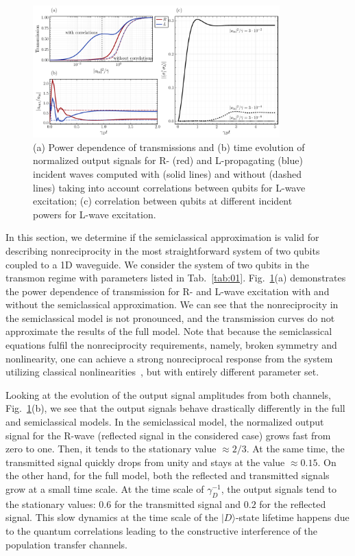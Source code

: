 \documentclass[lettersize,journal]{IEEEtran}
\begin{document}
\begin{figure}[t]
    \centering
    \includegraphics[width=0.85\textwidth]{fig_6}
    \caption{(a) Power dependence of transmissions and (b) time evolution of normalized output signals for R- (red) and L-propagating (blue) incident waves computed with (solid lines) and without (dashed lines) taking into account correlations between qubits for L-wave excitation; (c) correlation between qubits at different incident powers for L-wave excitation.}
    \label{fig:07}
\end{figure}
In this section, we determine if the semiclassical approximation is valid for describing nonreciprocity in the most straightforward system of two qubits coupled to a 1D waveguide.
We consider the system of two qubits in the transmon regime with parameters listed in Tab.~\ref{tab:01}.
Fig.~\ref{fig:07}(a) demonstrates the power dependence of transmission for R- and L-wave excitation with and without the semiclassical approximation.
We can see that the nonreciprocity in the semiclassical model is not pronounced, and the transmission curves do not approximate the results of the full model.
Note that because the semiclassical equations fulfil the nonreciprocity requirements, namely, broken symmetry and nonlinearity, one can achieve a strong nonreciprocal response from the system utilizing classical nonlinearities~\cite{cotrufo2021nonlinearity1, cotrufo2021nonlinearity2, sounas_fundamental_2018, yang_inverse-designed_2020}, but with entirely different parameter set.

Looking at the evolution of the output signal amplitudes from both channels, Fig.~\ref{fig:07}(b), we see that the output signals behave drastically differently in the full and semiclassical models.
In the semiclassical model, the normalized output signal for the R-wave (reflected signal in the considered case) grows fast from zero to one. 
Then, it tends to the stationary value $\approx 2/3$.
At the same time, the transmitted signal quickly drops from unity and stays at the value $\approx 0.15$.
On the other hand, for the full model, both the reflected and transmitted signals grow at a small time scale.
At the time scale of $\gamma_D^{-1}$, the output signals tend to the stationary values: $0.6$ for the transmitted signal and $0.2$ for the reflected signal.
This slow dynamics at the time scale of the $|D\rangle$-state lifetime happens due to the quantum correlations leading to the constructive interference of the population transfer channels.
\end{document}
